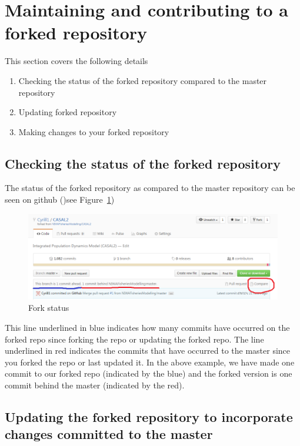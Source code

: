 \section{Maintaining and contributing to a forked repository\label{sec:maintain_repo}}

This section covers the following details

\begin{enumerate}
	\item Checking the status of the forked repository compared to the master repository
	\item Updating forked repository
	\item Making changes to your forked repository
\end{enumerate}

\subsection{Checking the status of the forked repository}

The status of the forked repository as compared to the master repository can be seen on github ()see Figure~\ref{fig:fork_status})

\begin{figure}[!ht]
	\centering
	\includegraphics[scale=0.6]{Figures/fork_status.png}
	\caption{Fork status}\label{fig:fork_status}
\end{figure}

This line underlined in blue indicates how many commits have occurred on the forked repo since forking the repo or updating the forked repo. The line underlined in red indicates the commits that have occurred to the master since you forked the repo or last updated it. In the above example, we have made one commit to our forked repo (indicated by the blue) and the forked version is one commit behind the master (indicated by the red). 



\subsection{Updating the forked repository to incorporate changes committed to the master}

